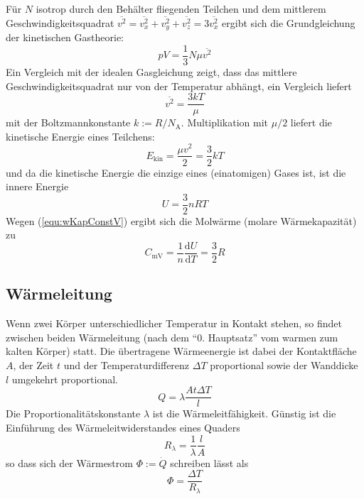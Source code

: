 \documentclass[a4paper]{scrartcl}
\begin{document}
Für $N$ isotrop durch den Behälter fliegenden Teilchen und dem mittlerem Geschwindigkeitsquadrat $\overline{v^2} = \overline{v_x^2} + \overline{v_y^2} + \overline{v_z^2} = 3 \overline{v_x^2}$ ergibt sich die Grundgleichung der kinetischen Gastheorie:
\begin{equation*}
  pV = \frac{1}{3} N \mu \overline{v^2}
\end{equation*}
Ein Vergleich mit der idealen Gasgleichung zeigt, dass das mittlere Geschwindigkeitsquadrat nur von der Temperatur abhängt, ein Vergleich liefert
\begin{equation*}
  \overline{v^2} = \frac{3kT}{\mu}
\end{equation*}
mit der Boltzmannkonstante $k := R/N_\text{A}$. Multiplikation mit $\mu/2$ liefert die kinetische Energie eines Teilchens:
\begin{equation*}
  E_\text{kin} = \frac{\mu v^2}{2} = \frac{3}{2}kT
\end{equation*}
und da die kinetische Energie die einzige eines (einatomigen) Gases ist, ist die innere Energie
\begin{equation*}
  U = \frac{3}{2}nRT
\end{equation*}
Wegen (\ref{equ:wKapConstV}) ergibt sich die Molwärme (molare Wärmekapazität) zu
\begin{equation*}
  C_\text{mV} = \frac{1}{n}\frac{\text{d}U}{\text{d}T} = \frac{3}{2}R
\end{equation*}

\subsection{Wärmeleitung}
Wenn zwei Körper unterschiedlicher Temperatur in Kontakt stehen, so findet zwischen beiden Wärmeleitung (nach dem "`0. Hauptsatz"' vom warmen zum kalten Körper) statt. Die übertragene Wärmeenergie ist dabei der Kontaktfläche $A$, der Zeit $t$ und der Temperaturdifferenz $\Delta T$ proportional sowie der Wanddicke $l$ umgekehrt proportional.
\begin{equation*}
  Q = \lambda \frac{At\Delta T}{l}
\end{equation*}
Die Proportionalitätskonstante $\lambda$ ist die Wärmeleitfähigkeit. Günstig ist die Einführung des Wärmeleitwiderstandes eines Quaders
\begin{equation*}
  R_\lambda = \frac{1}{\lambda}\frac{l}{A}
\end{equation*}
so dass sich der Wärmestrom $\Phi := \dot Q$ schreiben lässt als
\begin{equation*}
  \Phi = \frac{\Delta T}{R_\lambda}
\end{equation*}
\end{document}
